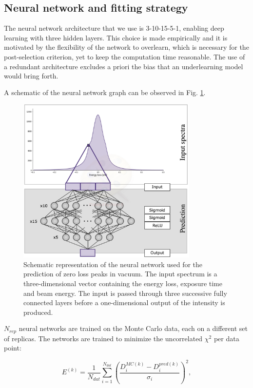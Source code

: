 \subsection{Neural network and fitting strategy}
The neural network architecture that we use is 3-10-15-5-1, enabling deep learning with three hidden layers. This choice is made empirically and it is motivated by the flexibility of the network to overlearn, which is necessary for the post-selection criterion, yet to keep the computation time reasonable. The use of a redundant architecture excludes a priori the bias that an underlearning model would bring forth. 

A schematic of the neural network graph can be observed in Fig. \ref{architecture}. 
\begin{figure}[H]
    \centering
    \includegraphics[width=90mm]{plots/architecture.jpg}
    \caption{Schematic representation of the neural network used for the prediction of zero loss peaks in vacuum. The input spectrum is a three-dimensional vector containing the energy loss, exposure time and beam energy. The input is passed through three successive fully connected layers before a one-dimensional output of the intensity is produced.}
    \label{architecture}
\end{figure}

$N_{rep}$ neural networks are trained on the Monte Carlo data, each on a different set of replicas. The networks are trained to minimize the uncorrelated $\chi^2$ per data point:

\begin{equation} \label{eq:chi2}
    E^{(k)} = \frac{1}{N_{dat}}\sum_{i=1}^{N_{dat}}\left(\frac{D_i^{MC(k)} - D_i^{pred(k)}}{\sigma_i}\right)^2, 
\end{equation}

